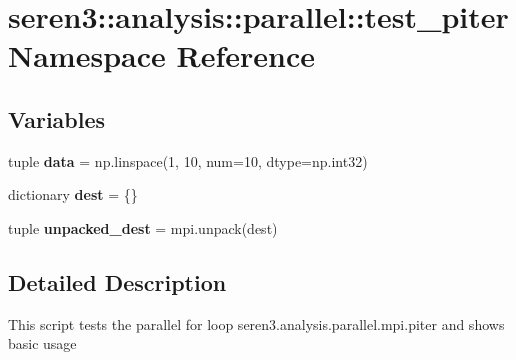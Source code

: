 \hypertarget{namespaceseren3_1_1analysis_1_1parallel_1_1test__piter}{
\section{seren3::analysis::parallel::test\_\-piter Namespace Reference}
\label{namespaceseren3_1_1analysis_1_1parallel_1_1test__piter}
}
\subsection*{Variables}
\begin{DoxyCompactItemize}
\item 
\hypertarget{namespaceseren3_1_1analysis_1_1parallel_1_1test__piter_ad828b79a77209bd0be6f0d1d42d4b407}{
tuple {\bfseries data} = np.linspace(1, 10, num=10, dtype=np.int32)}
\label{namespaceseren3_1_1analysis_1_1parallel_1_1test__piter_ad828b79a77209bd0be6f0d1d42d4b407}

\item 
\hypertarget{namespaceseren3_1_1analysis_1_1parallel_1_1test__piter_a2ed24e1fbd8946d59b8fdd1e8bd5b0bb}{
dictionary {\bfseries dest} = \{\}}
\label{namespaceseren3_1_1analysis_1_1parallel_1_1test__piter_a2ed24e1fbd8946d59b8fdd1e8bd5b0bb}

\item 
\hypertarget{namespaceseren3_1_1analysis_1_1parallel_1_1test__piter_a1933d822aef2a808a176c0d2ad129463}{
tuple {\bfseries unpacked\_\-dest} = mpi.unpack(dest)}
\label{namespaceseren3_1_1analysis_1_1parallel_1_1test__piter_a1933d822aef2a808a176c0d2ad129463}

\end{DoxyCompactItemize}


\subsection{Detailed Description}
\begin{DoxyVerb}
This script tests the parallel for loop seren3.analysis.parallel.mpi.piter and shows basic usage
\end{DoxyVerb}
 